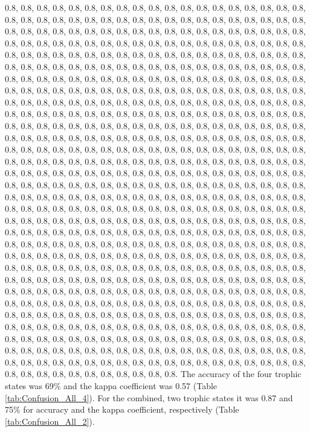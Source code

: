 \documentclass[11pt,]{article}
\begin{document}
0.8, 0.8, 0.8, 0.8, 0.8, 0.8, 0.8, 0.8, 0.8, 0.8, 0.8, 0.8, 0.8, 0.8,
0.8, 0.8, 0.8, 0.8, 0.8, 0.8, 0.8, 0.8, 0.8, 0.8, 0.8, 0.8, 0.8, 0.8,
0.8, 0.8, 0.8, 0.8, 0.8, 0.8, 0.8, 0.8, 0.8, 0.8, 0.8, 0.8, 0.8, 0.8,
0.8, 0.8, 0.8, 0.8, 0.8, 0.8, 0.8, 0.8, 0.8, 0.8, 0.8, 0.8, 0.8, 0.8,
0.8, 0.8, 0.8, 0.8, 0.8, 0.8, 0.8, 0.8, 0.8, 0.8, 0.8, 0.8, 0.8, 0.8,
0.8, 0.8, 0.8, 0.8, 0.8, 0.8, 0.8, 0.8, 0.8, 0.8, 0.8, 0.8, 0.8, 0.8,
0.8, 0.8, 0.8, 0.8, 0.8, 0.8, 0.8, 0.8, 0.8, 0.8, 0.8, 0.8, 0.8, 0.8,
0.8, 0.8, 0.8, 0.8, 0.8, 0.8, 0.8, 0.8, 0.8, 0.8, 0.8, 0.8, 0.8, 0.8,
0.8, 0.8, 0.8, 0.8, 0.8, 0.8, 0.8, 0.8, 0.8, 0.8, 0.8, 0.8, 0.8, 0.8,
0.8, 0.8, 0.8, 0.8, 0.8, 0.8, 0.8, 0.8, 0.8, 0.8, 0.8, 0.8, 0.8, 0.8,
0.8, 0.8, 0.8, 0.8, 0.8, 0.8, 0.8, 0.8, 0.8, 0.8, 0.8, 0.8, 0.8, 0.8,
0.8, 0.8, 0.8, 0.8, 0.8, 0.8, 0.8, 0.8, 0.8, 0.8, 0.8, 0.8, 0.8, 0.8,
0.8, 0.8, 0.8, 0.8, 0.8, 0.8, 0.8, 0.8, 0.8, 0.8, 0.8, 0.8, 0.8, 0.8,
0.8, 0.8, 0.8, 0.8, 0.8, 0.8, 0.8, 0.8, 0.8, 0.8, 0.8, 0.8, 0.8, 0.8,
0.8, 0.8, 0.8, 0.8, 0.8, 0.8, 0.8, 0.8, 0.8, 0.8, 0.8, 0.8, 0.8, 0.8,
0.8, 0.8, 0.8, 0.8, 0.8, 0.8, 0.8, 0.8, 0.8, 0.8, 0.8, 0.8, 0.8, 0.8,
0.8, 0.8, 0.8, 0.8, 0.8, 0.8, 0.8, 0.8, 0.8, 0.8, 0.8, 0.8, 0.8, 0.8,
0.8, 0.8, 0.8, 0.8, 0.8, 0.8, 0.8, 0.8, 0.8, 0.8, 0.8, 0.8, 0.8, 0.8,
0.8, 0.8, 0.8, 0.8, 0.8, 0.8, 0.8, 0.8, 0.8, 0.8, 0.8, 0.8, 0.8, 0.8,
0.8, 0.8, 0.8, 0.8, 0.8, 0.8, 0.8, 0.8, 0.8, 0.8, 0.8, 0.8, 0.8, 0.8,
0.8, 0.8, 0.8, 0.8, 0.8, 0.8, 0.8, 0.8, 0.8, 0.8, 0.8, 0.8, 0.8, 0.8,
0.8, 0.8, 0.8, 0.8, 0.8, 0.8, 0.8, 0.8, 0.8, 0.8, 0.8, 0.8, 0.8, 0.8,
0.8, 0.8, 0.8, 0.8, 0.8, 0.8, 0.8, 0.8, 0.8, 0.8, 0.8, 0.8, 0.8, 0.8,
0.8, 0.8, 0.8, 0.8, 0.8, 0.8, 0.8, 0.8, 0.8, 0.8, 0.8, 0.8, 0.8, 0.8,
0.8, 0.8, 0.8, 0.8, 0.8, 0.8, 0.8, 0.8, 0.8, 0.8, 0.8, 0.8, 0.8, 0.8,
0.8, 0.8, 0.8, 0.8, 0.8, 0.8, 0.8, 0.8, 0.8, 0.8, 0.8, 0.8, 0.8, 0.8,
0.8, 0.8, 0.8, 0.8, 0.8, 0.8, 0.8, 0.8, 0.8, 0.8, 0.8, 0.8, 0.8, 0.8,
0.8, 0.8, 0.8, 0.8, 0.8, 0.8, 0.8, 0.8, 0.8, 0.8, 0.8, 0.8, 0.8, 0.8,
0.8, 0.8, 0.8, 0.8, 0.8, 0.8, 0.8, 0.8, 0.8, 0.8, 0.8, 0.8, 0.8, 0.8,
0.8, 0.8, 0.8, 0.8, 0.8, 0.8, 0.8, 0.8, 0.8, 0.8, 0.8, 0.8, 0.8, 0.8,
0.8, 0.8, 0.8, 0.8, 0.8, 0.8, 0.8, 0.8, 0.8, 0.8, 0.8, 0.8, 0.8, 0.8,
0.8, 0.8, 0.8, 0.8, 0.8, 0.8, 0.8, 0.8, 0.8, 0.8, 0.8, 0.8, 0.8, 0.8,
0.8, 0.8, 0.8, 0.8, 0.8, 0.8, 0.8, 0.8, 0.8, 0.8, 0.8, 0.8, 0.8, 0.8,
0.8, 0.8, 0.8, 0.8, 0.8, 0.8, 0.8, 0.8, 0.8, 0.8, 0.8, 0.8, 0.8, 0.8,
0.8, 0.8, 0.8, 0.8, 0.8, 0.8, 0.8, 0.8, 0.8, 0.8, 0.8, 0.8, 0.8, 0.8,
0.8, 0.8, 0.8, 0.8, 0.8, 0.8, 0.8, 0.8, 0.8, 0.8, 0.8, 0.8, 0.8, 0.8,
0.8, 0.8, 0.8, 0.8, 0.8, 0.8, 0.8, 0.8, 0.8, 0.8, 0.8, 0.8, 0.8, 0.8,
0.8, 0.8, 0.8, 0.8, 0.8, 0.8, 0.8, 0.8, 0.8, 0.8, 0.8, 0.8, 0.8, 0.8,
0.8, 0.8, 0.8, 0.8, 0.8, 0.8, 0.8, 0.8, 0.8, 0.8, 0.8, 0.8, 0.8, 0.8,
0.8, 0.8, 0.8, 0.8, 0.8, 0.8, 0.8, 0.8, 0.8, 0.8, 0.8, 0.8, 0.8, 0.8,
0.8, 0.8, 0.8, 0.8, 0.8, 0.8, 0.8, 0.8, 0.8, 0.8, 0.8, 0.8, 0.8, 0.8,
0.8, 0.8, 0.8, 0.8, 0.8, 0.8, 0.8, 0.8, 0.8, 0.8, 0.8, 0.8, 0.8, 0.8,
0.8, 0.8, 0.8, 0.8, 0.8, 0.8, 0.8, 0.8, 0.8, 0.8, 0.8, 0.8. The accuracy
of the four trophic states was 69\% and the kappa coefficient was 0.57
(Table \ref{tab:Confusion_All_4}). For the combined, two trophic states
it was 0.87 and 75\% for accuracy and the kappa coefficient,
respectively (Table \ref{tab:Confusion_All_2}).
\end{document}
